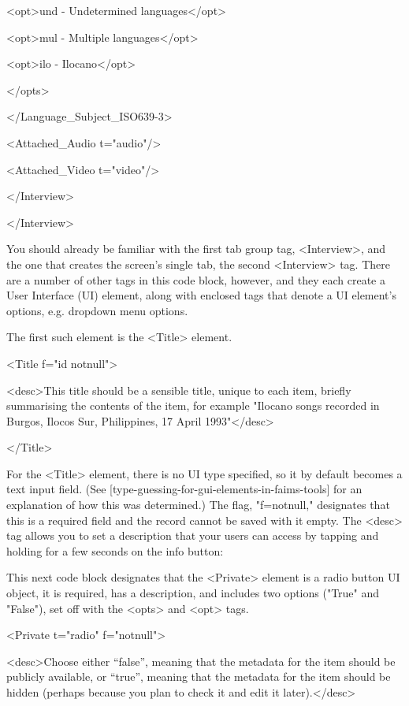 <opt>und - Undetermined languages</opt>

<opt>mul - Multiple languages</opt>

<opt>ilo - Ilocano</opt>

</opts>

</Language_Subject_ISO639-3>

<Attached_Audio t="audio"/>

<Attached_Video t="video"/>

</Interview>

</Interview>

You should already be familiar with the first tab group tag, <Interview>, and the one that creates the screen's single tab, the second <Interview> tag. There are a number of other tags in this code block, however, and they each create a User Interface (UI) element, along with enclosed tags that denote a UI element's options, e.g. dropdown menu options.

The first such element is the <Title> element.

<Title f="id notnull">

<desc>This title should be a sensible title, unique to each item, briefly summarising the contents of the item, for example "Ilocano songs recorded in Burgos, Ilocos Sur, Philippines, 17 April 1993"</desc>

</Title>

For the <Title> element, there is no UI type specified, so it by default becomes a text input field. (See [type-guessing-for-gui-elements-in-faims-tools] for an explanation of how this was determined.) The flag, "f=notnull," designates that this is a required field and the record cannot be saved with it empty. The <desc> tag allows you to set a description that your users can access by tapping and holding for a few seconds on the info button:

{}

This next code block designates that the <Private> element is a radio button UI object, it is required, has a description, and includes two options ("True" and "False"), set off with the <opts> and <opt> tags.

<Private t="radio" f="notnull">

<desc>Choose either “false”, meaning that the metadata for the item should be publicly available, or “true”, meaning that the metadata for the item should be hidden (perhaps because you plan to check it and edit it later).</desc>

